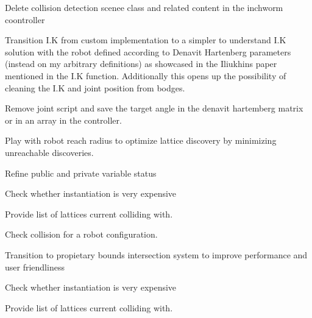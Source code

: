
\begin{DoxyRefList}
\item[Class \mbox{\hyperlink{class_illa_controller_v3}{Illa\+Controller\+V3}} ]\label{todo__todo000001}%
%
Delete collision detection scenee class and related content in the inchworm coontroller 



Transition I.\+K from custom implementation to a simpler to understand I.\+K solution with the robot defined according to Denavit Hartenberg parameters (instead on my arbitrary definitions) as showcased in the Iliukhin\textquotesingle{}s paper mentioned in the I.\+K function. Additionally this opens up the possibility of cleaning the I.\+K and joint position from bodges. 



Remove joint script and save the target angle in the denavit hartemberg matrix or in an array in the controller. 



Play with robot reach radius to optimize lattice discovery by minimizing unreachable discoveries. 



Refine public and private variable status  
\item[Member \mbox{\hyperlink{class_illa_controller_v3_a8cf1cf2655a3174e928f8b3f161a4b2f}{Illa\+Controller\+V3.Is\+Pose\+Colliding}} (\mbox{\hyperlink{class_pos_j}{PosJ}} Pose\+To\+Check)]\label{todo__todo000002}%
%
Check whether instantiation is very expensive

\label{todo__todo000003}%
%
Provide list of lattices current colliding with.

\label{todo__todo000004}%
%
Check collision for a robot configuration.  
\item[Class \mbox{\hyperlink{class_illa_node_sensor_script}{Illa\+Node\+Sensor\+Script}} ]\label{todo__todo000006}%
%
Transition to propietary bounds intersection system to improve performance and user friendliness  
\item[Member \mbox{\hyperlink{class_inchworm_robot_controller_a434da4643498bd898d99a63678492ae4}{Inchworm\+Robot\+Controller.Is\+Pose\+Colliding}} (\mbox{\hyperlink{class_pos_j}{PosJ}} Pose\+To\+Check)]\label{todo__todo000007}%
%
Check whether instantiation is very expensive

\label{todo__todo000008}%
%
Provide list of lattices current colliding with.


\end{DoxyRefList}
